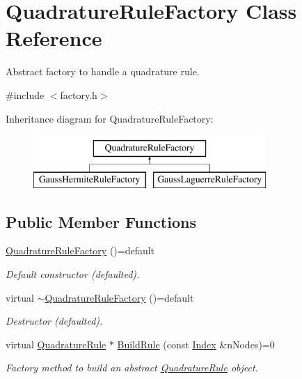 \hypertarget{classQuadratureRuleFactory}{\section{Quadrature\-Rule\-Factory Class Reference}
\label{classQuadratureRuleFactory}
}


Abstract factory to handle a quadrature rule.  




{\ttfamily \#include $<$factory.\-h$>$}

Inheritance diagram for Quadrature\-Rule\-Factory\-:\begin{figure}[H]
\begin{center}
\leavevmode
\includegraphics[height=2.000000cm]{classQuadratureRuleFactory}
\end{center}
\end{figure}
\subsection*{Public Member Functions}
\begin{DoxyCompactItemize}
\item 
\hypertarget{classQuadratureRuleFactory_a2c094b9c41d5a88ae4e8e4ef1f665cf8}{\hyperlink{classQuadratureRuleFactory_a2c094b9c41d5a88ae4e8e4ef1f665cf8}{Quadrature\-Rule\-Factory} ()=default}\label{classQuadratureRuleFactory_a2c094b9c41d5a88ae4e8e4ef1f665cf8}

\begin{DoxyCompactList}\small\item\em Default constructor (defaulted). \end{DoxyCompactList}\item 
\hypertarget{classQuadratureRuleFactory_a0744c125ab0b59fb96f8d9d33491d594}{virtual \hyperlink{classQuadratureRuleFactory_a0744c125ab0b59fb96f8d9d33491d594}{$\sim$\-Quadrature\-Rule\-Factory} ()=default}\label{classQuadratureRuleFactory_a0744c125ab0b59fb96f8d9d33491d594}

\begin{DoxyCompactList}\small\item\em Destructor (defaulted). \end{DoxyCompactList}\item 
virtual \hyperlink{classQuadratureRule}{Quadrature\-Rule} $\ast$ \hyperlink{classQuadratureRuleFactory_adc9f82328b7cba8517e462e99c58335e}{Build\-Rule} (const \hyperlink{typedefs_8h_a2c726f8f32697958e9d6c2afecda531d}{Index} \&n\-Nodes)=0
\begin{DoxyCompactList}\small\item\em Factory method to build an abstract \hyperlink{classQuadratureRule}{Quadrature\-Rule} object. \end{DoxyCompactList}\end{DoxyCompactItemize}


